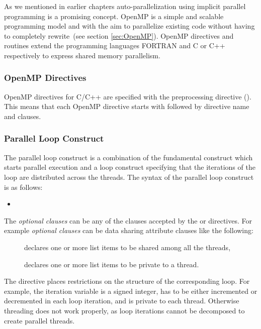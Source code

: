 As we mentioned in earlier chapters auto-parallelization using
implicit parallel programming is a promising concept. OpenMP is a simple and
scalable programming model and with the aim to parallelize existing code
without having to completely rewrite~(see section
\ref{sec:OpenMP}). OpenMP directives and routines extend the
programming languages FORTRAN and C or C++ respectively to express
shared memory parallelism.

\subsubsection{OpenMP Directives}

OpenMP directives for C/C++ are specified with the \textbf{}
preprocessing directive (\cite{openMP05}). This means that each
OpenMP directive starts with \textbf{} followed by
directive name and clauses. 
 
\subsubsection{Parallel Loop Construct}

The parallel loop construct is a combination of the fundamental
construct \textbf{} which starts parallel execution and
a loop construct specifying that the iterations of the loop are
distributed across the threads. The syntax of the parallel loop
construct  is as follows:

\begin{itemize}
\item {} 
\end{itemize} 
The \textit{optional clauses} can be any of the clauses accepted by the
 or  directives. For
example \textit{optional clauses} can be data sharing attribute
clauses like the following:

\begin{description}
\item[] declares one or more list items to
  be shared among all the threads,
\item[] declares one or more list items
  to be private to a thread.
\end{description}

The  directive places restrictions on the structure
of the corresponding loop. For example, the iteration variable is
a signed integer, has to be either incremented or decremented in each
loop iteration, and is private to each thread. Otherwise threading does
not work properly, as loop iterations cannot be decomposed to create
parallel threads.

